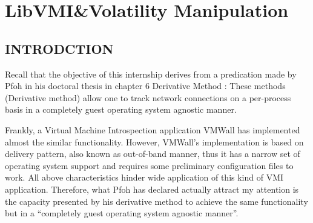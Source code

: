 
\chapter{LibVMI\&Volatility Manipulation} %

\label{Chapter7} %



\section{INTRODCTION}
Recall that the objective of this internship derives from a predication made by Pfoh in his doctoral thesis in chapter 6 Derivative Method \cite{Reference7}: 
These methods (Derivative method) allow one to track network connections on a per-process basis in a completely guest operating system agnostic manner.

Frankly, a Virtual Machine Introspection application VMWall \cite{Reference2} has implemented almost the similar functionality. 
However, VMWall’s implementation is based on delivery pattern, also known as out-of-band manner, 
thus it has a narrow set of operating system support and requires some preliminary configuration files to work. 
All above characteristics hinder wide application of this kind of VMI application. Therefore, what Pfoh has declared actually 
attract my attention is the capacity presented by his derivative method to achieve the same functionality but in a 
“completely guest operating system agnostic manner”.

